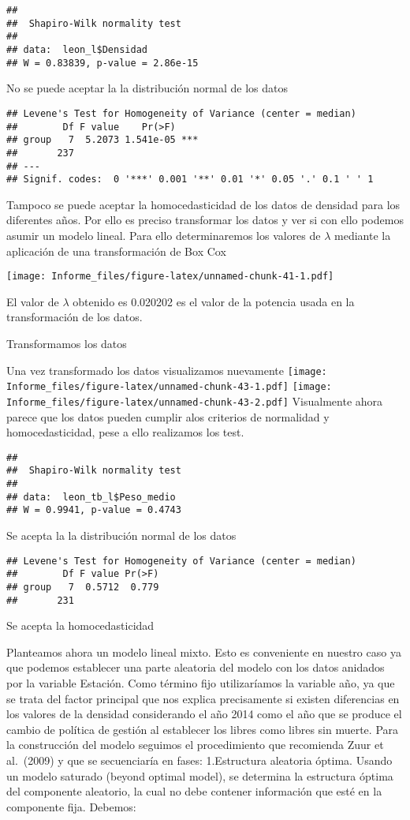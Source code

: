 \documentclass[
]{article}
\begin{document}
\begin{verbatim}
## 
##  Shapiro-Wilk normality test
## 
## data:  leon_l$Densidad
## W = 0.83839, p-value = 2.86e-15
\end{verbatim}

No se puede aceptar la la distribución normal de los datos

\begin{verbatim}
## Levene's Test for Homogeneity of Variance (center = median)
##        Df F value    Pr(>F)    
## group   7  5.2073 1.541e-05 ***
##       237                      
## ---
## Signif. codes:  0 '***' 0.001 '**' 0.01 '*' 0.05 '.' 0.1 ' ' 1
\end{verbatim}

Tampoco se puede aceptar la homocedasticidad de los datos de densidad
para los diferentes años. Por ello es preciso transformar los datos y
ver si con ello podemos asumir un modelo lineal. Para ello
determinaremos los valores de \(\lambda\) mediante la aplicación de una
transformación de Box Cox

\texttt{[image: Informe\_files/figure-latex/unnamed-chunk-41-1.pdf]}

El valor de \(\lambda\) obtenido es 0.020202 es el valor de la potencia
usada en la transformación de los datos.

Transformamos los datos

Una vez transformado los datos visualizamos nuevamente
\texttt{[image: Informe\_files/figure-latex/unnamed-chunk-43-1.pdf]}
\texttt{[image: Informe\_files/figure-latex/unnamed-chunk-43-2.pdf]}
Visualmente ahora parece que los datos pueden cumplir alos criterios de
normalidad y homocedasticidad, pese a ello realizamos los test.

\begin{verbatim}
## 
##  Shapiro-Wilk normality test
## 
## data:  leon_tb_l$Peso_medio
## W = 0.9941, p-value = 0.4743
\end{verbatim}

Se acepta la la distribución normal de los datos

\begin{verbatim}
## Levene's Test for Homogeneity of Variance (center = median)
##        Df F value Pr(>F)
## group   7  0.5712  0.779
##       231
\end{verbatim}

Se acepta la homocedasticidad

Planteamos ahora un modelo lineal mixto. Esto es conveniente en nuestro
caso ya que podemos establecer una parte aleatoria del modelo con los
datos anidados por la variable Estación. Como término fijo utilizaríamos
la variable año, ya que se trata del factor principal que nos explica
precisamente si existen diferencias en los valores de la densidad
considerando el año 2014 como el año que se produce el cambio de
política de gestión al establecer los libres como libres sin muerte.
Para la construcción del modelo seguimos el procedimiento que recomienda
Zuur et al.~(2009) y que se secuenciaría en fases: 1.Estructura
aleatoria óptima. Usando un modelo saturado (beyond optimal model), se
determina la estructura óptima del componente aleatorio, la cual no debe
contener información que esté en la componente fija. Debemos:
\end{document}
